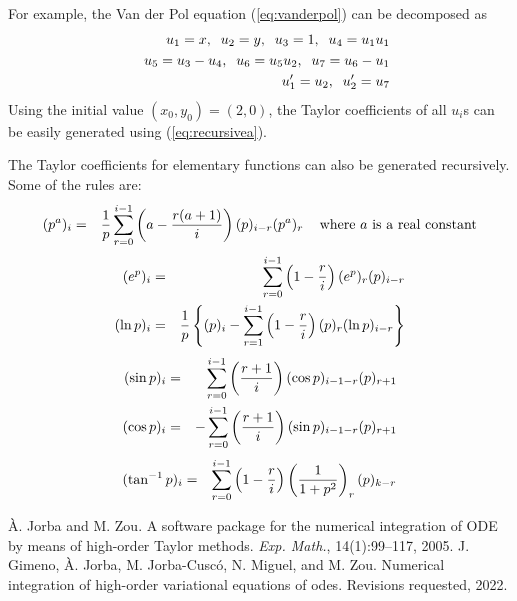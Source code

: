 \documentclass[10pt]{article}
\theoremstyle{remark}
\begin{document}
For example, the Van der Pol equation (\ref{eq:vanderpol}) can be
decomposed as
\begin{eqnarray*}
& & u_1 = x,\;\;  u_2 = y,\;\; u_3 = 1,\;\; u_4= u_1 u_1\cr
& & u_5 = u_3-u_4,\;\; u_6 = u_5 u_2,\;\; u_7= u_6-u_1\cr
& & u_1' = u_2, \;\; u_2'= u_7
\end{eqnarray*}
Using the initial value $(x_0, y_0)=(2, 0)$, the Taylor coefficients
of all $u_i$s can be easily generated using (\ref{eq:recursivea}).


The Taylor coefficients for elementary functions can also be generated
recursively. Some of the rules are:
\begin{eqnarray*}
(p^a)_i &=& {1 \over p} \sum_{r=0}^{i-1}\left(
a - { {r(a+1)\over i}}\right)(p)_{i-r}(p^a)_r\;\;\; \mbox{
where $a$ is a real constant} 
\end{eqnarray*}
\begin{eqnarray*}
(e^p)_i &=& \sum_{r=0}^{i-1} \left(1-{r\over i}\right)
(e^p)_r (p)_{i-r}\cr
(\ln p)_i &=& {1\over {p}} \left\{ (p)_i - \sum_{r=1}^{i-1}
\left(1 - {r\over i}\right)(p)_r(\ln p)_{i-r}\right\}
\end{eqnarray*}
\begin{eqnarray*}
(\sin p)_i &=& \sum_{r=0}^{i-1}\left({{r+1}\over
i}\right)(\cos p)_{i-1-r} (p)_{r+1}\cr
(\cos p)_i &=& -\sum_{r=0}^{i-1}\left({{r+1}\over
i}\right)(\sin p)_{i-1-r} (p)_{r+1}\cr
\end{eqnarray*}
\begin{eqnarray*}
(\tan^{-1} p)_i &=& \sum_{r=0}^{i-1}\left(1 - {r\over i}\right)
\left( {1 \over {1+p^2}}\right)_r (p)_{k-r}
\end{eqnarray*}



\begin{thebibliography}{9}
 \`A. Jorba and M. Zou. A software package for the
  numerical integration of ODE by means of high-order Taylor
  methods. {\it Exp. Math.}, 14(1):99–117, 2005.
 J. Gimeno, \`A. Jorba, M. Jorba-Cusc\'o, N. Miguel,
  and M. Zou. Numerical integration of high-order variational
  equations of odes. Revisions requested, 2022.
\end{thebibliography}
\end{document}
